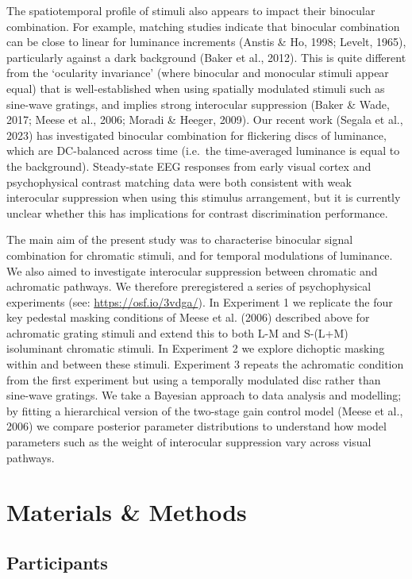 \documentclass[
  letterpaper,
  DIV=11,
  numbers=noendperiod]{scrartcl}
\begin{document}
The spatiotemporal profile of stimuli also appears to impact their
binocular combination. For example, matching studies indicate that
binocular combination can be close to linear for luminance increments
(Anstis \& Ho, 1998; Levelt, 1965), particularly against a dark
background (Baker et al., 2012). This is quite different from the
`ocularity invariance' (where binocular and monocular stimuli appear
equal) that is well-established when using spatially modulated stimuli
such as sine-wave gratings, and implies strong interocular suppression
(Baker \& Wade, 2017; Meese et al., 2006; Moradi \& Heeger, 2009). Our
recent work (Segala et al., 2023) has investigated binocular combination
for flickering discs of luminance, which are DC-balanced across time
(i.e.~the time-averaged luminance is equal to the background).
Steady-state EEG responses from early visual cortex and psychophysical
contrast matching data were both consistent with weak interocular
suppression when using this stimulus arrangement, but it is currently
unclear whether this has implications for contrast discrimination
performance.

The main aim of the present study was to characterise binocular signal
combination for chromatic stimuli, and for temporal modulations of
luminance. We also aimed to investigate interocular suppression between
chromatic and achromatic pathways. We therefore preregistered a series
of psychophysical experiments (see: \url{https://osf.io/3vdga/}). In
Experiment 1 we replicate the four key pedestal masking conditions of
Meese et al. (2006) described above for achromatic grating stimuli and
extend this to both L-M and S-(L+M) isoluminant chromatic stimuli. In
Experiment 2 we explore dichoptic masking within and between these
stimuli. Experiment 3 repeats the achromatic condition from the first
experiment but using a temporally modulated disc rather than sine-wave
gratings. We take a Bayesian approach to data analysis and modelling; by
fitting a hierarchical version of the two-stage gain control model
(Meese et al., 2006) we compare posterior parameter distributions to
understand how model parameters such as the weight of interocular
suppression vary across visual pathways.

\section{Materials \& Methods}\label{materials-methods}

\subsection{Participants}\label{participants}
\end{document}

